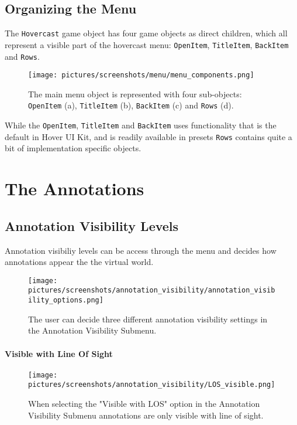 \subsection{Organizing the Menu}
The \texttt{Hovercast} game object has four game objects as direct children, which all represent a visible part of the hovercast menu:
\texttt{OpenItem}, \texttt{TitleItem}, \texttt{BackItem} and \texttt{Rows}. 

\begin{figure}%
	\texttt{[image: pictures/screenshots/menu/menu\_components.png]}
	\caption[The Menu components]{The main menu object is represented with four sub-objects: \texttt{OpenItem} (a), \texttt{TitleItem} (b), \texttt{BackItem} (c) 
			 and \texttt{Rows} (d).}
	\label{fig:menu_components}
\end{figure}

While the \texttt{OpenItem}, \texttt{TitleItem} and \texttt{BackItem} uses functionality that is the default in Hover UI Kit, and is readily available in presets
\texttt{Rows} contains quite a bit of implementation specific objects. 

\section{The Annotations}

\subsection{Annotation Visibility Levels}
Annotation visibiliy levels can be access through the menu and decides how annotations appear the the virtual world. 

\begin{figure}%
	\texttt{[image: pictures/screenshots/annotation\_visibility/annotation\_visibility\_options.png]}
	\caption[The Annotation Visibility Submenu]{The user can decide three different annotation visibility settings in the Annotation Visibility Submenu.}
	\label{fig:annotation_visibility_options}
\end{figure} 


\paragraph{Visible with Line Of Sight}
\begin{figure}%
	\texttt{[image: pictures/screenshots/annotation\_visibility/LOS\_visible.png]}
	\caption[Annotations only visible with LOS]{When selecting the "Visible with LOS" option in the Annotation Visibility Submenu annotations are only visible with 
				line of sight.}
	\label{fig:LOS_visible}
\end{figure} 



